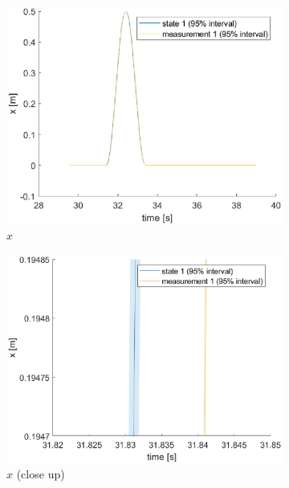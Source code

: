 \documentclass[a4paper,kul]{kulakarticle} %
\begin{document}
\begin{figure}[htp!]
	\centering
	\begin{subfigure}[b]{0.48\textwidth}
		\centering
		\includegraphics[width=\textwidth]{state1.eps}
		\caption{$x$}
	\end{subfigure}
	\hfill
	\begin{subfigure}[b]{0.48\textwidth}  
		\centering 
		\includegraphics[width=\textwidth]{state1_closeup.eps}
		\caption{$x$ (close up)}
	\end{subfigure}
	\begin{subfigure}[b]{0.48\textwidth}
		\centering

\end{subfigure}
\end{figure}
\end{document}
